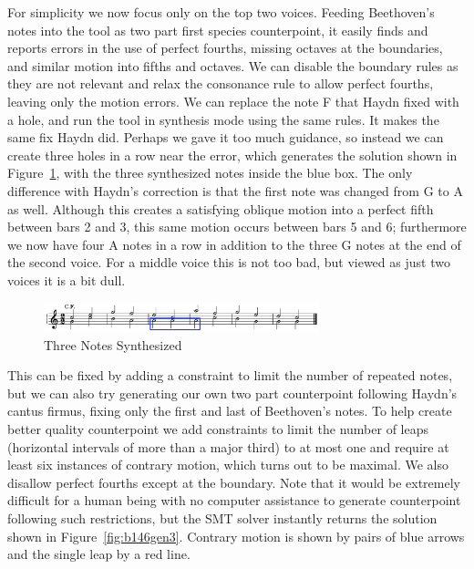 \documentclass[sigplan,screen]{acmart}
\begin{document}
For simplicity we now focus only on the top two voices. Feeding
Beethoven's notes into the tool as two part first species
counterpoint, it easily finds and reports errors in the use of perfect
fourths, missing octaves at the boundaries, and similar motion into
fifths and octaves. We can disable the boundary rules as they are not
relevant and relax the consonance rule to allow perfect fourths, leaving
only the motion errors. We can replace the note F that Haydn fixed
with a hole, and run the tool in synthesis mode using the same
rules. It makes the same fix Haydn did. Perhaps we gave it too much
guidance, so instead we can create three holes in a row near the
error, which generates the solution shown in
Figure~\ref{fig:b146fix3}, with the three synthesized notes inside the
blue box. The only difference with Haydn's correction is
that the first note was changed from G to A as well. Although this
creates a satisfying oblique motion into a perfect fifth between bars
2 and 3, this same motion occurs between bars 5 and 6; furthermore we
now have four A notes in a row in addition to the three G notes at the
end of the second voice. For a middle voice this is not too bad, but
viewed as just two voices it is a bit dull.

\begin{figure}
  \includegraphics[width=8cm]{figures/b146fix3.png}
  \caption{Three Notes Synthesized}
  \label{fig:b146fix3}
\end{figure}

This can be fixed by adding a constraint to limit the number of repeated
notes, but we can also try generating our own two part counterpoint
following Haydn's cantus firmus, fixing only the first and last of
Beethoven's notes. To help create better quality counterpoint we add
constraints to limit the number of leaps (horizontal intervals of more
than a major third) to at most one and require at least six instances
of contrary motion, which turns out to be maximal. We also disallow
perfect fourths except at the boundary. Note that it would
be extremely difficult for a human being with no computer assistance
to generate counterpoint following such restrictions, but the SMT
solver instantly returns the solution shown in
Figure~\ref{fig:b146gen3}. Contrary motion is shown by pairs of blue
arrows and the single leap by a red line.
\end{document}
